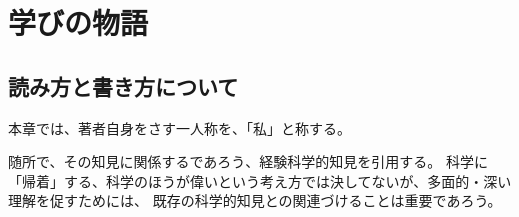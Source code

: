 \chapter{学びの物語}

\section{読み方と書き方について}
本章では、著者自身をさす一人称を、「私」と称する。

随所で、その知見に関係するであろう、経験科学的知見を引用する。
科学に「帰着」する、科学のほうが偉いという考え方では決してないが、多面的・深い理解を促すためには、
既存の科学的知見との関連づけることは重要であろう。
